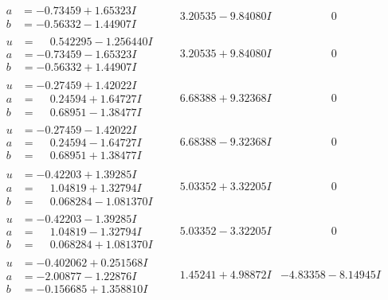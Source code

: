 \documentclass[1p]{elsarticle_modified}
\theoremstyle{definition}
\begin{document}
$$\begin{array}{c|c|c}
\begin{aligned}
a &= -0.73459 + 1.65323 I \\
b &= -0.56332 - 1.44907 I\end{aligned}
 & \phantom{-}3.20535 - 9.84080 I & \phantom{-0.000000 } 0 \\ \hline\begin{aligned}
u &= \phantom{-}0.542295 - 1.256440 I \\
a &= -0.73459 - 1.65323 I \\
b &= -0.56332 + 1.44907 I\end{aligned}
 & \phantom{-}3.20535 + 9.84080 I & \phantom{-0.000000 } 0 \\ \hline\begin{aligned}
u &= -0.27459 + 1.42022 I \\
a &= \phantom{-}0.24594 + 1.64727 I \\
b &= \phantom{-}0.68951 - 1.38477 I\end{aligned}
 & \phantom{-}6.68388 + 9.32368 I & \phantom{-0.000000 } 0 \\ \hline\begin{aligned}
u &= -0.27459 - 1.42022 I \\
a &= \phantom{-}0.24594 - 1.64727 I \\
b &= \phantom{-}0.68951 + 1.38477 I\end{aligned}
 & \phantom{-}6.68388 - 9.32368 I & \phantom{-0.000000 } 0 \\ \hline\begin{aligned}
u &= -0.42203 + 1.39285 I \\
a &= \phantom{-}1.04819 + 1.32794 I \\
b &= \phantom{-}0.068284 - 1.081370 I\end{aligned}
 & \phantom{-}5.03352 + 3.32205 I & \phantom{-0.000000 } 0 \\ \hline\begin{aligned}
u &= -0.42203 - 1.39285 I \\
a &= \phantom{-}1.04819 - 1.32794 I \\
b &= \phantom{-}0.068284 + 1.081370 I\end{aligned}
 & \phantom{-}5.03352 - 3.32205 I & \phantom{-0.000000 } 0 \\ \hline\begin{aligned}
u &= -0.402062 + 0.251568 I \\
a &= -2.00877 - 1.22876 I \\
b &= -0.156685 + 1.358810 I\end{aligned}
 & \phantom{-}1.45241 + 4.98872 I & -4.83358 - 8.14945 I \\ \hline\begin{aligned}

\end{aligned}
\end{array}$$
\end{document}
